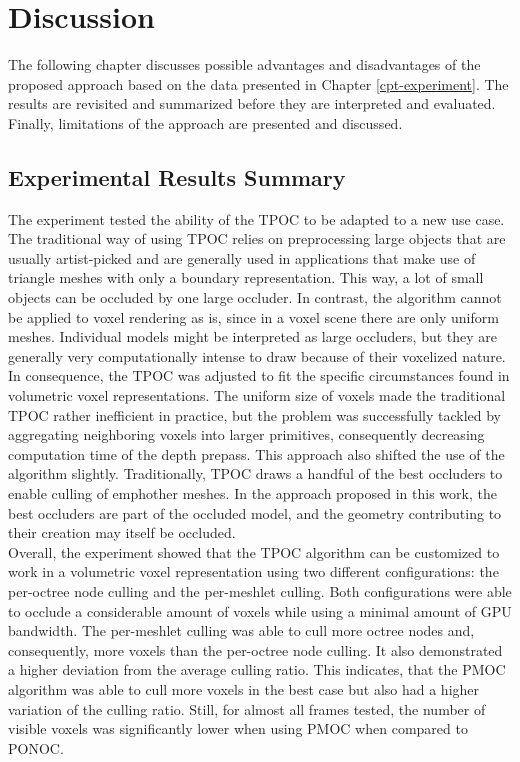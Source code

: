 \chapter{Discussion} \label{cpt-discussion}

The following chapter discusses possible advantages and disadvantages of the proposed approach based on 
the data presented in Chapter \ref{cpt-experiment}. The results are revisited and summarized before they 
are interpreted and evaluated. Finally, limitations of the approach are presented and discussed.

\section{Experimental Results Summary}

The experiment tested the ability of the \ac{TPOC} to be adapted to a new use case. The traditional way of 
using \ac{TPOC} relies on preprocessing large objects that are usually artist-picked and are generally used 
in applications that make use of triangle meshes with only a boundary representation. This way, a lot of 
small objects can be occluded by one large occluder. In contrast, the algorithm cannot be applied to voxel 
rendering as is, since in a voxel scene there are only uniform meshes. Individual models might be interpreted 
as large occluders, but they are generally very computationally intense to draw because of their voxelized 
nature. \\

\noindent
In consequence, the \ac{TPOC} was adjusted to fit the specific circumstances found in volumetric voxel representations. 
The uniform size of voxels made the traditional \ac{TPOC} rather inefficient in practice, but the problem was 
successfully tackled by aggregating neighboring voxels into larger primitives, consequently decreasing computation 
time of the depth prepass. This approach also shifted the use of the algorithm slightly. Traditionally, \ac{TPOC} 
draws a handful of the best occluders to enable culling of emph{other} meshes. In the approach proposed in this work, 
the best occluders are part of the occluded model, and the geometry contributing to their creation may itself be 
occluded. \\

\noindent
Overall, the experiment showed that the \ac{TPOC} algorithm can be customized to work in a volumetric voxel 
representation using two different configurations: the per-octree node culling and the per-meshlet culling. 
Both configurations were able to occlude a considerable amount of voxels while using a minimal amount of 
\ac{GPU} bandwidth. The per-meshlet culling was able to cull more octree nodes and, consequently, more 
voxels than the per-octree node culling. It also demonstrated a higher deviation from the average culling 
ratio. This indicates, that the \ac{PMOC} algorithm was able to cull more voxels in the best case but also 
had a higher variation of the culling ratio. Still, for almost all frames tested, the number of visible 
voxels was significantly lower when using \ac{PMOC} when compared to \ac{PONOC}.\\

